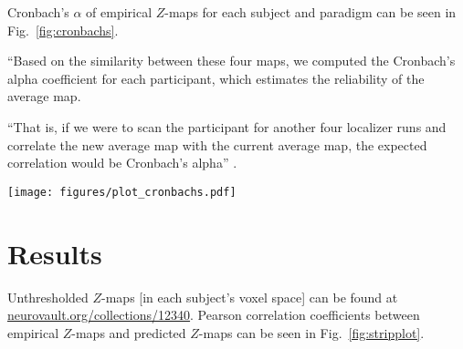 
%
Cronbach's $\alpha$ of empirical $Z$-maps for each subject and paradigm
can be seen in Fig.~\ref{fig:cronbachs}.

``Based on the similarity between these four maps, we computed the Cronbach's
alpha coefficient for each participant, which estimates the reliability of the
average map.

%
\citep{feilong2022individualized} ``That is, if we were to scan the participant
for another four localizer runs and correlate the new average map with the
current average map, the expected correlation would be Cronbach's alpha''
\citep{feilong2022individualized}.



\begin{figure*}[tbp] \centering
    \texttt{[image: figures/plot\_cronbachs.pdf]}
    \caption{\textbf{Cronbach's $\alpha$ of the empirical $Z$-maps for each
    paradigm and subject.}
    Cronbach's $\alpha$ was calculated based on the $Z$-maps yielded by the
    first level \ac{glm} analyses of the visual localizer
    \citep{sengupta2016extension} (four runs) and naturalistic stimuli
    \citep{haeusler2022processing} (eight segments each) respectively.
    The second-level \ac{glm} analyses across runs / segments yielded the
    empirical $Z$-maps that were estimated in the present study.
    \textbf{needs legend for medians and means}
    }
    \label{fig:cronbachs}
\end{figure*}


\section{Results}





Unthresholded $Z$-maps [in each subject's voxel space] can be found at
\href{https://identifiers.org/neurovault.collection:12340}{\url{neurovault.org/collections/12340}}.
%
Pearson correlation coefficients between empirical $Z$-maps and predicted
$Z$-maps can be seen in Fig.~\ref{fig:stripplot}.



